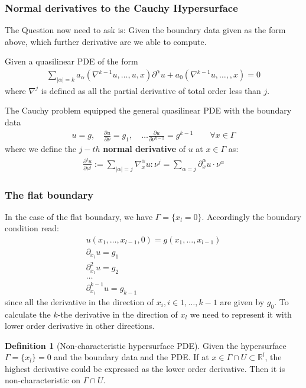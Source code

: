 \documentclass[a4paper,11pt,oneside,fleqn]{book}
\theoremstyle{definition}
\newtheorem{definition}{Definition}[section]
\theoremstyle{remark}
\begin{document}
\subsubsection{Normal derivatives to the Cauchy Hypersurface}
The Question now need to ask is: Given the boundary data given as the form above, which further derivative are we able to compute. \par 
Given a quasilinear PDE of the form
\begin{align*}
	\sum_{|\alpha| = k} a_\alpha(\nabla^{k -1}u, \dots, u, x) \partial^\alpha u + a_0(\nabla^{k -1} u, \dots, , x)  = 0
\end{align*}
where $\nabla^j$ is defined as all the partial derivative of total order less than $j$.\par 
The Cauchy problem equipped the general quasilinear PDE with the boundary data
\begin{align*}
	u = g, \quad \frac{\partial u}{\partial \nu} = g_1, \quad \dots \frac{\partial u}{\partial \nu^{k-1}} = g^{k -1} \qquad \forall x \in \Gamma
\end{align*}
where we define the $j-th$ \textbf{normal derivative} of $u$ at $x \in \Gamma$ as:
\begin{align*}
	\frac{\partial^j u}{\partial \nu^j}:= \sum_{|\alpha| = j} \nabla^\alpha_x u : \nu^j = \sum_{\alpha = j} \partial_x^\alpha u \cdot  \nu^\alpha
\end{align*}

\subsubsection{The flat boundary}
In the case of the flat boundary, we have $\Gamma = \{ x_l = 0\}$. Accordingly the boundary condition read:
\begin{align*}
	u(x_1, \dots, x_{l-1}, 0) = g(x_1, \dots, x_{l-1})\\
	\partial_{x_l} u = g_1\\
	\partial^2_{x_l} u = g_2\\
	\dots\\
	\partial^{k-1}_{x_l} u = g_{k-1}
\end{align*}
since all the derivative in the direction of $x_i, i \in {1, \dots, k-1}$ are given by $g_0$. To calculate the $k$-the derivative in the direction of $x_l$ we need to represent it with lower order derivative in other directions. 


\begin{definition}[Non-characteristic hypersurface PDE]
	Given the hypersurface $\Gamma = \{ x_l \} = 0$ and the boundary data and the PDE. If at $x \in \Gamma \cap U \subset \mathbb{R}^l$, the highest derivative could be expressed as the lower order derivative. Then it is non-characteristic on $\Gamma \cap U$.  
\end{definition}
\end{document}
